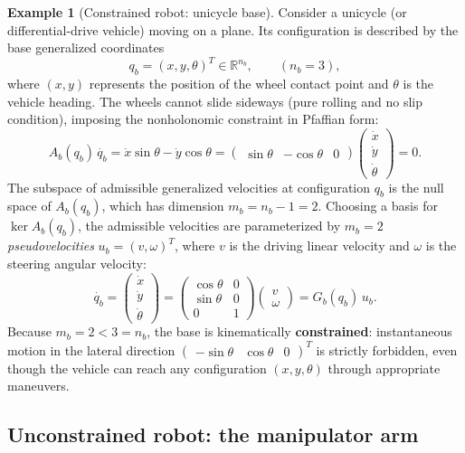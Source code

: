 \documentclass[11pt,a4paper]{article}
\def\bm#1{#1}%
\newcommand{\R}{\mathbb{R}}
\newcommand{\qbase}{\bm{q}_b}
\newcommand{\ubase}{\bm{u}_b}
\newcommand{\Gbase}{\bm{G}_b}
\theoremstyle{definition}
\newtheorem{example}[definition]{Example}
\theoremstyle{plain}
\theoremstyle{remark}
\begin{document}
\begin{example}[Constrained robot: unicycle base]
Consider a unicycle (or differential-drive vehicle) moving on a plane. Its configuration is described by the base generalized coordinates
\[
\qbase = (x, y, \theta)^T \in \R^{n_b},\qquad (n_b = 3),
\]
where $(x,y)$ represents the position of the wheel contact point and $\theta$ is the vehicle heading.
The wheels cannot slide sideways (pure rolling and no slip condition), imposing the nonholonomic constraint in Pfaffian form:
\[
\bm A_b(\qbase)\,\dot{\qbase} = \dot x\sin\theta - \dot y\cos\theta = \begin{pmatrix}\sin\theta & -\cos\theta & 0\end{pmatrix}\begin{pmatrix}\dot x\\ \dot y\\ \dot\theta\end{pmatrix} = 0.
\]
The subspace of admissible generalized velocities at configuration $\qbase$ is the null space of $\bm A_b(\qbase)$, which has dimension $m_b = n_b - 1 = 2$.
Choosing a basis for $\ker\bm A_b(\qbase)$, the admissible velocities are parameterized by $m_b = 2$ \emph{pseudovelocities} $\ubase = (v, \omega)^T$, where $v$ is the driving linear velocity and $\omega$ is the steering angular velocity:
\[
\dot{\qbase} = \begin{pmatrix}\dot x\\ \dot y\\ \dot\theta\end{pmatrix} = \begin{pmatrix}\cos\theta & 0\\ \sin\theta & 0\\ 0 & 1\end{pmatrix}\begin{pmatrix}v\\ \omega\end{pmatrix} = \Gbase(\qbase)\,\ubase .
\]
Because $m_b = 2 < 3 = n_b$, the base is kinematically \textbf{constrained}: instantaneous motion in the lateral direction $\begin{pmatrix}-\sin\theta & \cos\theta & 0\end{pmatrix}^T$ is strictly forbidden, even though the vehicle can reach any configuration $(x,y,\theta)$ through appropriate maneuvers.
\end{example}

\subsection*{Unconstrained robot: the manipulator arm}
\end{document}
